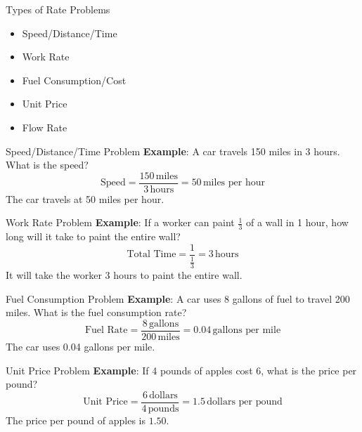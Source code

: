 \documentclass{beamer}
\begin{document}
\begin{frame}{Types of Rate Problems}
    \begin{itemize}
        \item Speed/Distance/Time
        \item Work Rate
        \item Fuel Consumption/Cost
        \item Unit Price
        \item Flow Rate
    \end{itemize}
\end{frame}

\begin{frame}{Speed/Distance/Time Problem}
    \textbf{Example}: A car travels 150 miles in 3 hours. What is the speed? \\
    \vspace{0.3cm}
    $$
    \text{Speed} = \frac{150 \, \text{miles}}{3 \, \text{hours}} = 50 \, \text{miles per hour}
    $$
    The car travels at 50 miles per hour.
\end{frame}

\begin{frame}{Work Rate Problem}
    \textbf{Example}: If a worker can paint $\frac{1}{3} $ of a wall in 1 hour, how long will it take to paint the entire wall? \\
    \vspace{0.3cm}
    $$
    \text{Total Time} = \frac{1}{\frac{1}{3}} = 3 \, \text{hours}
    $$
    It will take the worker 3 hours to paint the entire wall.
\end{frame}

\begin{frame}{Fuel Consumption Problem}
    \textbf{Example}: A car uses 8 gallons of fuel to travel 200 miles. What is the fuel consumption rate? \\
    \vspace{0.3cm}
   $$
    \text{Fuel Rate} = \frac{8 \, \text{gallons}}{200 \, \text{miles}} = 0.04 \, \text{gallons per mile}
    $$
    The car uses 0.04 gallons per mile.
\end{frame}

\begin{frame}{Unit Price Problem}
    \textbf{Example}: If 4 pounds of apples cost $6$, what is the price per pound? \\
    \vspace{0.3cm}
    $$
    \text{Unit Price} = \frac{6 \, \text{dollars}}{4 \, \text{pounds}} = 1.5 \, \text{dollars per pound}
    $$
    The price per pound of apples is $1.50$.
\end{frame}
\end{document}
